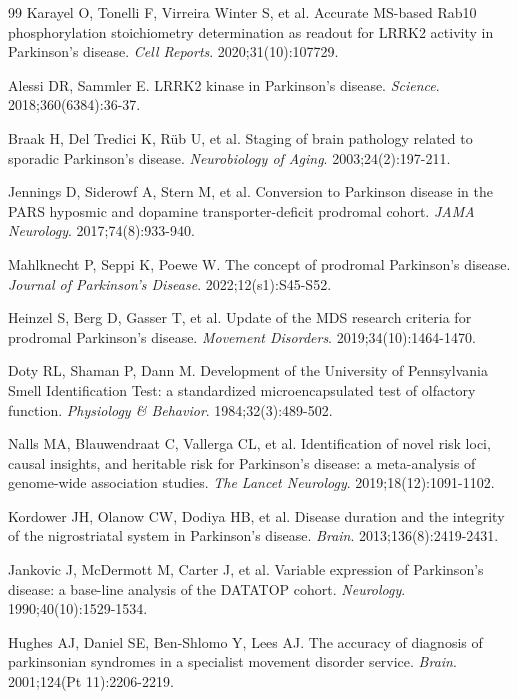 \documentclass[11pt]{article}
\begin{document}
\begin{thebibliography}{99}
Karayel O, Tonelli F, Virreira Winter S, et al. Accurate MS-based Rab10 phosphorylation stoichiometry determination as readout for LRRK2 activity in Parkinson's disease. \textit{Cell Reports}. 2020;31(10):107729.

Alessi DR, Sammler E. LRRK2 kinase in Parkinson's disease. \textit{Science}. 2018;360(6384):36-37.

Braak H, Del Tredici K, Rüb U, et al. Staging of brain pathology related to sporadic Parkinson's disease. \textit{Neurobiology of Aging}. 2003;24(2):197-211.

Jennings D, Siderowf A, Stern M, et al. Conversion to Parkinson disease in the PARS hyposmic and dopamine transporter-deficit prodromal cohort. \textit{JAMA Neurology}. 2017;74(8):933-940.

Mahlknecht P, Seppi K, Poewe W. The concept of prodromal Parkinson's disease. \textit{Journal of Parkinson's Disease}. 2022;12(s1):S45-S52.

Heinzel S, Berg D, Gasser T, et al. Update of the MDS research criteria for prodromal Parkinson's disease. \textit{Movement Disorders}. 2019;34(10):1464-1470.

Doty RL, Shaman P, Dann M. Development of the University of Pennsylvania Smell Identification Test: a standardized microencapsulated test of olfactory function. \textit{Physiology \& Behavior}. 1984;32(3):489-502.

Nalls MA, Blauwendraat C, Vallerga CL, et al. Identification of novel risk loci, causal insights, and heritable risk for Parkinson's disease: a meta-analysis of genome-wide association studies. \textit{The Lancet Neurology}. 2019;18(12):1091-1102.

Kordower JH, Olanow CW, Dodiya HB, et al. Disease duration and the integrity of the nigrostriatal system in Parkinson's disease. \textit{Brain}. 2013;136(8):2419-2431.

Jankovic J, McDermott M, Carter J, et al. Variable expression of Parkinson's disease: a base-line analysis of the DATATOP cohort. \textit{Neurology}. 1990;40(10):1529-1534.

Hughes AJ, Daniel SE, Ben-Shlomo Y, Lees AJ. The accuracy of diagnosis of parkinsonian syndromes in a specialist movement disorder service. \textit{Brain}. 2001;124(Pt 11):2206-2219.

\end{thebibliography}
\end{document}
